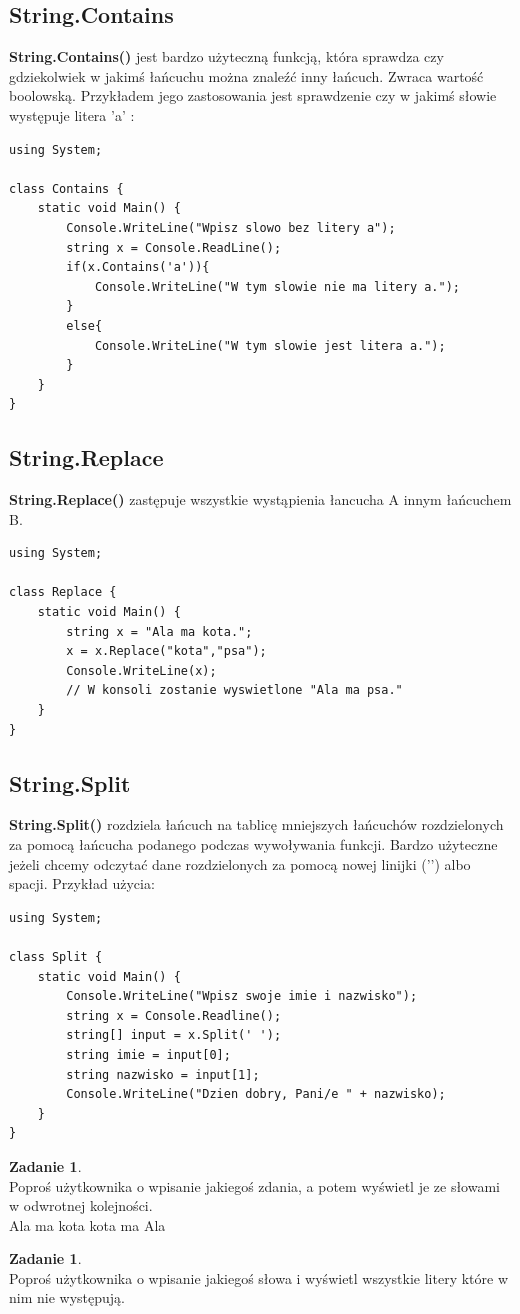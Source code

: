\documentclass[a4paper]{article}
\theoremstyle{definition}
\newtheorem{zadanie}[theorem]{Zadanie}
\begin{document}
\subsection{String.Contains}
\textbf{String.Contains()} jest bardzo użyteczną funkcją, która sprawdza czy gdziekolwiek w jakimś łańcuchu można znaleźć inny łańcuch. Zwraca wartość boolowską. Przykładem jego zastosowania jest sprawdzenie czy w jakimś słowie występuje litera 'a' :\\
\begin{lstlisting}[frame=single]
using System;

class Contains {
    static void Main() {
    	Console.WriteLine("Wpisz slowo bez litery a");
        string x = Console.ReadLine();
        if(x.Contains('a')){
        	Console.WriteLine("W tym slowie nie ma litery a.");
        }
        else{
        	Console.WriteLine("W tym slowie jest litera a.");
        }
    }
}
\end{lstlisting}
\subsection{String.Replace}
\textbf{String.Replace()} zastępuje wszystkie wystąpienia łancucha A innym łańcuchem B.\\
\begin{lstlisting}[frame=single]
using System;

class Replace {
    static void Main() {
        string x = "Ala ma kota.";
        x = x.Replace("kota","psa");
        Console.WriteLine(x);
        // W konsoli zostanie wyswietlone "Ala ma psa."
    }
}
\end{lstlisting}
\subsection{String.Split}
\textbf{String.Split()} rozdziela łańcuch na tablicę mniejszych łańcuchów rozdzielonych za pomocą łańcucha podanego podczas wywoływania funkcji. Bardzo użyteczne jeżeli chcemy odczytać dane rozdzielonych za pomocą nowej linijki ('\n') albo spacji. Przykład użycia:\\
\begin{lstlisting}[frame=single]
using System;

class Split {
    static void Main() {
        Console.WriteLine("Wpisz swoje imie i nazwisko");
        string x = Console.Readline();
        string[] input = x.Split(' ');
        string imie = input[0];
        string nazwisko = input[1];
        Console.WriteLine("Dzien dobry, Pani/e " + nazwisko);
    }
}
\end{lstlisting}
\begin{zadanie}
\\Poproś użytkownika o wpisanie jakiegoś zdania, a potem wyświetl je ze słowami w odwrotnej kolejności.
\\\textrm{Ala ma kota \rightarrow \textrm{kota  ma  Ala}}
\end{zadanie}
\begin{zadanie}
\\Poproś użytkownika o wpisanie jakiegoś słowa i wyświetl wszystkie litery które w nim nie występują.
\end{zadanie}
\pagebreak
\end{document}
